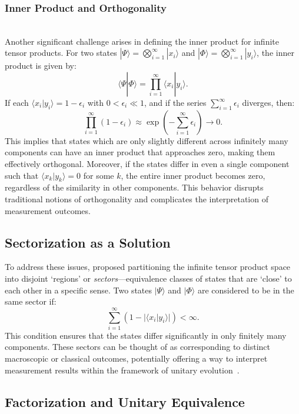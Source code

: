 \documentclass[shortAfour,sageh,times]{sagej}
\begin{document}
\subsubsection{Inner Product and Orthogonality} \hfill\\[-0.1in]

Another significant challenge arises in defining the inner product for infinite tensor products. For two states $|\Psi\rangle = \bigotimes_{i=1}^{\infty} | x _i\rangle$ and $|\Phi\rangle = \bigotimes_{i=1}^{\infty} | y _i\rangle$, the inner product is given by:
\[
\langle \Psi | \Phi \rangle = \prod_{i=1}^{\infty} \langle  x _i |  y _i \rangle.
\]
If each $\langle  x _i |  y _i \rangle = 1 - \epsilon_i$ with $0 < \epsilon_i \ll 1$, and if the series $\sum_{i=1}^{\infty} \epsilon_i$ diverges, then:
\[
\prod_{i=1}^{\infty} (1 - \epsilon_i) \approx \exp\left(-\sum_{i=1}^{\infty} \epsilon_i\right) \to 0.
\]
This implies that states which are only slightly different across infinitely many components can have an inner product that approaches zero, making them effectively orthogonal. Moreover, if the states differ in even a single component such that $\langle  x _k |  y _k \rangle = 0$ for some $k$, the entire inner product becomes zero, regardless of the similarity in other components. This behavior disrupts traditional notions of orthogonality and complicates the interpretation of measurement outcomes.

\subsection{Sectorization as a Solution}
\label{2025-idi-sectorization}

To address these issues, \cite{vonNeumann1939} proposed partitioning the infinite tensor product space into disjoint `regions' or \textit{sectors}---equivalence classes of states that are `close' to each other in a specific sense. Two states $|\Psi\rangle$ and $|\Phi\rangle$ are considered to be in the same sector if:
\[
\sum_{i=1}^{\infty} (1 - |\langle  x _i |  y _i \rangle|) < \infty.
\]
This condition ensures that the states differ significantly in only finitely many components. These sectors can be thought of as corresponding to distinct macroscopic or classical outcomes, potentially offering a way to interpret measurement results within the framework of unitary evolution~\citep{Grangier-2020,van-den-bossche-2023-a,van-den-bossche-2023-b,van-den-bossche-2023-c}.

\subsection{Factorization and Unitary Equivalence}
\end{document}
